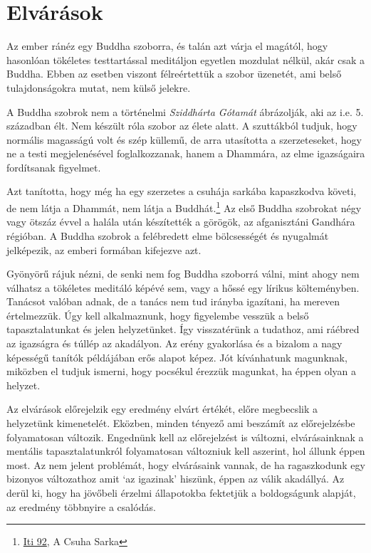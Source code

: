 \clearpage

\section{Elvárások}


\noindent Az ember ránéz egy Buddha szoborra, és talán azt várja el
magától, hogy hasonlóan tökéletes testtartással meditáljon egyetlen
mozdulat nélkül, akár csak a Buddha. Ebben az esetben viszont
félreértettük a szobor üzenetét, ami belső tulajdonságokra mutat, nem
külső jelekre.

A Buddha szobrok nem a történelmi \emph{Sziddhárta Gótamát} ábrázolják,
aki az i.e. 5. században élt. Nem készült róla szobor az élete alatt. A
szuttákból tudjuk, hogy normális magasságú volt és szép küllemű, de arra
utasította a szerzeteseket, hogy ne a testi megjelenésével
foglalkozzanak, hanem a Dhammára, az elme igazságaira fordítsanak
figyelmet.

Azt tanította, hogy még ha egy szerzetes a csuhája sarkába kapaszkodva
követi, de nem látja a Dhammát, nem látja a Buddhát.\footnote{\href{https://suttacentral.net/iti92}{Iti
  92}, A Csuha Sarka} Az első Buddha szobrokat négy vagy ötszáz évvel a
halála után készítették a görögök, az afganisztáni Gandhára régióban. A
Buddha szobrok a felébredett elme bölcsességét és nyugalmát jelképezik,
az emberi formában kifejezve azt.

Gyönyörű rájuk nézni, de senki nem fog Buddha szoborrá válni, mint ahogy
nem válhatsz a tökéletes meditáló képévé sem, vagy a hőssé egy lírikus
költeményben. Tanácsot valóban adnak, de a tanács nem tud irányba
igazítani, ha mereven értelmezzük. Úgy kell alkalmaznunk, hogy
figyelembe vesszük a belső tapasztalatunkat és jelen helyzetünket. Így
visszatérünk a tudathoz, ami ráébred az igazságra és túllép az
akadályon. Az erény gyakorlása és a bizalom a nagy képességű tanítók
példájában erős alapot képez. Jót kívánhatunk magunknak, miközben el
tudjuk ismerni, hogy pocsékul érezzük magunkat, ha éppen olyan a
helyzet.

Az elvárások előrejelzik egy eredmény elvárt értékét, előre megbecslik a
helyzetünk kimenetelét. Eközben, minden tényező ami beszámít az
előrejelzésbe folyamatosan változik. Engednünk kell az előrejelzést is
változni, elvárásainknak a mentális tapasztalatunkról folyamatosan
változniuk kell aszerint, hol állunk éppen most. Az nem jelent
problémát, hogy elvárásaink vannak, de ha ragaszkodunk egy bizonyos
változathoz amit `az igazinak' hiszünk, éppen az válik akadállyá. Az
derül ki, hogy ha jövőbeli érzelmi állapotokba fektetjük a boldogságunk
alapját, az eredmény többnyire a csalódás.

